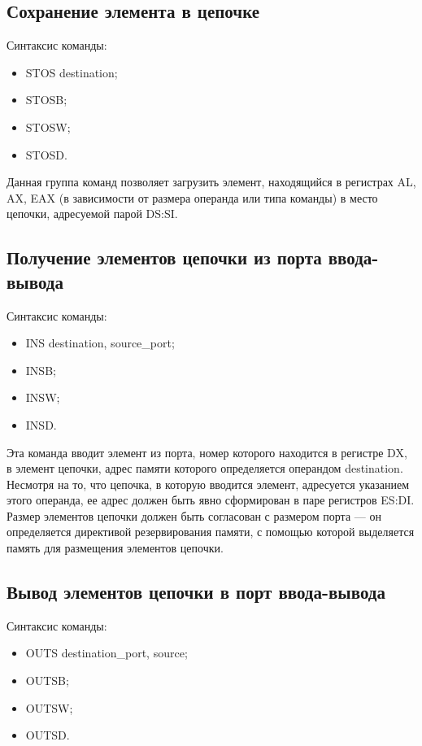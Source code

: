 \newpage 

\subsection{Сохранение элемента в цепочке}

Синтаксис команды:
\begin{itemize}
\item STOS destination;
\item STOSB;
\item STOSW;
\item STOSD.
\end{itemize}

Данная группа команд позволяет загрузить элемент, находящийся в регистрах AL, AX, EAX
(в зависимости от размера операнда или типа команды) в место цепочки, адресуемой парой DS:SI.

\subsection{Получение элементов цепочки из порта ввода-вывода}

Синтаксис команды:
\begin{itemize}
\item INS destination, source\_port;
\item INSB;
\item INSW;
\item INSD.
\end{itemize}

Эта команда вводит элемент из порта, номер которого находится в регистре DX,
в элемент цепочки, адрес памяти которого определяется операндом destination.
Несмотря на то, что цепочка, в которую вводится элемент, адресуется указанием
этого операнда, ее адрес должен быть явно сформирован в паре регистров
ES:DI. Размер элементов цепочки должен быть согласован с размером порта ---
он определяется директивой резервирования памяти, с помощью которой выделяется
память для размещения элементов цепочки.

\subsection{Вывод элементов цепочки в порт ввода-вывода}

Синтаксис команды:
\begin{itemize}
\item OUTS destination\_port, source;
\item OUTSB;
\item OUTSW;
\item OUTSD.
\end{itemize}

